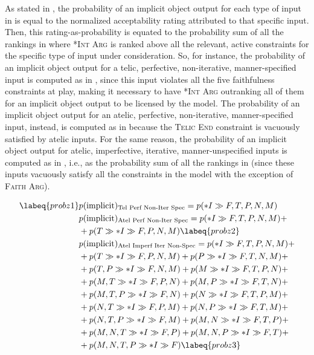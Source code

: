 As stated in , the probability of an implicit object output for each type of input in  is equal to the normalized acceptability rating attributed to that specific input. Then, this rating-as-probability is equated to the probability sum of all the rankings in  where \textsc{*Int Arg} is ranked above all the relevant, active constraints for the specific type of input under consideration. So, for instance, the probability of an implicit object output for a telic, perfective, non-iterative, manner-specified input is computed as in , since this input violates all the five faithfulness constraints at play, making it necessary to have \textsc{*Int Arg} outranking all of them for an implicit object output to be licensed by the model. The probability of an implicit object output for an atelic, perfective, non-iterative, manner-specified input, instead, is computed as in  because the \textsc{Telic End} constraint is vacuously satisfied by atelic inputs. For the same reason, the probability of an implicit object output for atelic, imperfective, iterative, manner-unspecified inputs is computed as in , i.e., as the probability sum of all the rankings in  (since these inputs vacuously satisfy all the constraints in the model with the exception of \textsc{Faith Arg}).

\begin{align}  \labeq{probz1}
    & p(\text{implicit})\textsubscript{Tel Perf Non-Iter Spec} = p(*I \gg {F, T, P, N, M}) \\
    & p(\text{implicit})\textsubscript{Atel Perf Non-Iter Spec} = p(*I \gg {F, T, P, N, M}) + \nonumber \\ & + p(T \gg *I \gg {F, P, N, M}) \labeq{probz2}\\
    & p(\text{implicit})\textsubscript{Atel Imperf Iter Non-Spec} = p(*I \gg {F, T, P, N, M}) + \nonumber \\ & + p(T \gg *I \gg {F, P, N, M}) + p(P \gg *I \gg {F, T, N, M}) + \nonumber \\ & + p({T, P} \gg *I \gg {F, N, M}) + p(M \gg *I \gg {F, T, P, N}) + \nonumber \\ & + p({M, T} \gg *I \gg {F, P, N}) + p({M, P} \gg *I \gg {F, T, N}) + \nonumber \\ & + p({M, T, P} \gg *I \gg {F, N}) + p(N \gg *I \gg {F, T, P, M}) + \nonumber \\ & + p({N, T} \gg *I \gg {F, P, M}) + p({N, P} \gg *I \gg {F, T, M}) + \nonumber \\ & + p({N, T, P} \gg *I \gg {F, M}) + p({M, N} \gg *I \gg {F, T, P}) + \nonumber \\ & + p({M, N, T} \gg *I \gg {F, P}) + p({M, N, P} \gg *I \gg {F, T}) + \nonumber \\ & + p({M, N, T, P} \gg *I \gg F) \labeq{probz3}
\end{align}

